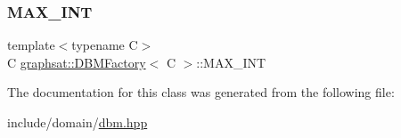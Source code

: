 \mbox{\label{classgraphsat_1_1_d_b_m_factory_ab31453fbd3195ee7bbe6e1571af9e420}} 
\subsubsection{\texorpdfstring{MAX\_INT}{MAX\_INT}}
{\footnotesize\ttfamily template$<$typename C$>$ \\
C \mbox{\hyperlink{classgraphsat_1_1_d_b_m_factory}{graphsat\+::\+D\+B\+M\+Factory}}$<$ C $>$\+::M\+A\+X\+\_\+\+I\+NT\hspace{0.3cm}{\ttfamily [private]}}



The documentation for this class was generated from the following file\+:\begin{DoxyCompactItemize}
\item 
include/domain/\mbox{\hyperlink{dbm_8hpp}{dbm.\+hpp}}\end{DoxyCompactItemize}

